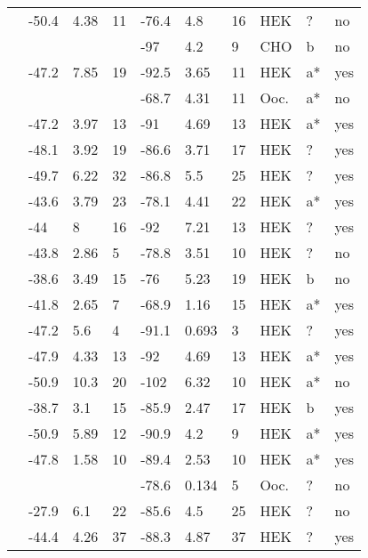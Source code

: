 \begin{longtable}{p{5cm}|lll|lll|lll}
\citet{Liu2003aMutationDB} & -50.4 & 4.38 & 11 & -76.4 & 4.8 & 16 & HEK & ? & no \\
\citet{Liu2005MutationDB} & && & -97 & 4.2 & 9 & CHO & b & no \\
\citet{Lupoglazoff2001MutationDB} & -47.2 & 7.85 & 19 & -92.5 & 3.65 & 11 & HEK & a* & yes \\
\citet{Makita1998MutationDB} & && & -68.7 & 4.31 & 11 & Ooc. & a* & no \\
\citet{Makita2002MutationDB} & -47.2 & 3.97 & 13 & -91 & 4.69 & 13 & HEK & a* & yes \\
\citet{Makita2005MutationDB} & -48.1 & 3.92 & 19 & -86.6 & 3.71 & 17 & HEK & ? & yes \\
\citet{Makita2008MutationDB} & -49.7 & 6.22 & 32 & -86.8 & 5.5 & 25 & HEK & ? & yes \\
\citet{Makiyama2008MutationDB} & -43.6 & 3.79 & 23 & -78.1 & 4.41 & 22 & HEK & a* & yes \\
\citet{Marangoni2011MutationDB} & -44 & 8 & 16 & -92 & 7.21 & 13 & HEK & ? & yes \\
\citet{MedeirosDomingo2007MutationDB} & -43.8 & 2.86 & 5 & -78.8 & 3.51 & 10 & HEK & ? & no \\
\citet{MedeirosDomingo2009MutationDB} & -38.6 & 3.49 & 15 & -76 & 5.23 & 19 & HEK & b & no \\
\citet{Mohler2004MutationDB} & -41.8 & 2.65 & 7 & -68.9 & 1.16 & 15 & HEK & a* & yes \\
\citet{Mok2003MutationDB} & -47.2 & 5.6 & 4 & -91.1 & 0.693 & 3 & HEK & ? & yes \\
\citet{Moreau2013MutationDB} & -47.9 & 4.33 & 13 & -92 & 4.69 & 13 & HEK & a* & yes \\
\citet{Murphy2012MutationDB} & -50.9 & 10.3 & 20 & -102 & 6.32 & 10 & HEK & a* & no \\
\citet{Nakajima2015MutationDB} & -38.7 & 3.1 & 15 & -85.9 & 2.47 & 17 & HEK & b & yes \\
\citet{Neu2010MutationDB} & -50.9 & 5.89 & 12 & -90.9 & 4.2 & 9 & HEK & a* & yes \\
\citet{Nguyen2008MutationDB} & -47.8 & 1.58 & 10 & -89.4 & 2.53 & 10 & HEK & a* & yes \\
\citet{OLeary2002MutationDB} & && & -78.6 & 0.134 & 5 & Ooc. & ? & no \\
\citet{Olesen2012MutationDB} & -27.9 & 6.1 & 22 & -85.6 & 4.5 & 25 & HEK & ? & no \\
\citet{Otagiri2008MutationDB} & -44.4 & 4.26 & 37 & -88.3 & 4.87 & 37 & HEK & ? & yes \\

\end{longtable}
